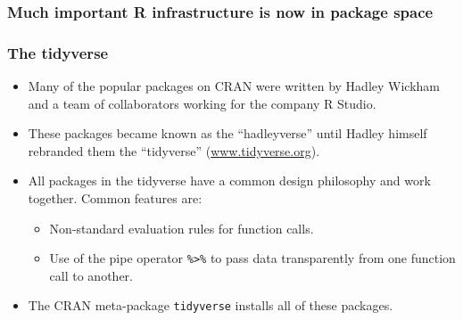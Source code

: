 \documentclass[svgnames]{beamer}
\begin{document}
\begin{frame}
  \frametitle{Much important R infrastructure is now in package space}

  \begin{center}
  \end{center}
    
\end{frame}

\begin{frame}[fragile]
  \frametitle{The tidyverse}
  
  \begin{itemize}
  \item Many of the popular packages on CRAN were written by Hadley Wickham
    and a team of collaborators working for the company R Studio.
  \item These packages became known as the ``hadleyverse'' until Hadley
    himself rebranded them the ``tidyverse'' (\url{www.tidyverse.org}).
  \item All packages in the tidyverse have a common design philosophy
    and work together. Common features are:
    \begin{itemize}
    \item Non-standard evaluation rules for function calls.
    \item Use of the pipe operator \verb+%>%+ to pass data
      transparently from one function call to another.
    \end{itemize}
  \item The CRAN meta-package \texttt{tidyverse} installs all of these
    packages.
  \end{itemize}
  
\end{frame}
\end{document}
